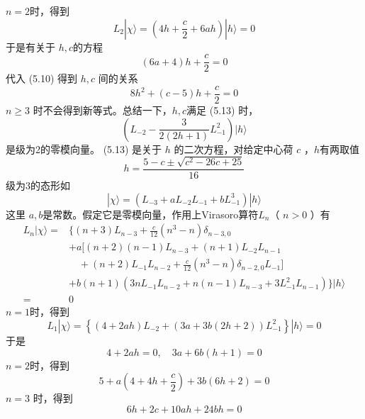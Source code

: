 $n=2 $时，得到
\begin{equation}
L_{2}|\chi\rangle=\left(4 h+\frac{c}{2}+6 a h\right)|h\rangle=0
\end{equation}
于是有关于 $h,c $的方程
\begin{equation}
	(6 a+4) h+\frac{c}{2}=0
\end{equation}
代入 (5.10) 得到 $h,c$ 间的关系
\begin{equation}
	8 h^{2}+(c-5) h+\frac{c}{2}=0
\end{equation}
$n\geq 3$ 时不会得到新等式。总结一下，$ h,c $满足 (5.13) 时，
\begin{equation}
	\left(L_{-2}-\frac{3}{2(2 h+1)} L_{-1}^{2}\right)|h\rangle
\end{equation}
是级为2的零模向量。 (5.13) 是关于 $h$ 的二次方程，对给定中心荷 $c$ ，$ h $有两取值
\begin{equation}
	h=\frac{5-c \pm \sqrt{c^{2}-26 c+25}}{16}
\end{equation}
级为3的态形如
\begin{equation}
	|\chi\rangle=\left(L_{-3}+a L_{-2} L_{-1}+b L_{-1}^{3}\right)|h\rangle
\end{equation}
这里 $a,b $是常数。假定它是零模向量，作用上Virasoro算符$ L_n $（ $n>0$ ）有
\begin{equation}
	\begin{aligned} L_{n}|\chi\rangle=&\Big\{(n+3) L_{n-3}+\frac{c}{12}\left(n^{3}-n\right) \delta_{n-3,0} \\ &+a \big[(n+2)(n-1) L_{n-3}+(n+1) L_{-2} L_{n-1} \\ &\quad +(n+2) L_{-1} L_{n-2}+\frac{c}{12} (n^{3}-n ) \delta_{n-2,0} L_{-1} \big] \\ &+b(n+1) (3 n L_{-1} L_{n-2}+n(n-1) L_{n-3} +3 L_{-1}^{2} L_{n-1} ) \Big\}|h\rangle \\=&0 \end{aligned}
\end{equation}
$n=1 $时，得到
\begin{equation}
	L_{1}|\chi\rangle=\left\{(4+2 a h) L_{-2}+(3 a+3 b(2 h+2)) L_{-1}^{2}\right\}|h\rangle=0
\end{equation}
于是
\begin{equation}
	4+2 a h=0, \quad 3 a+6 b(h+1)=0
\end{equation}
$n=2 $时，得到
\begin{equation}
	5+a\left(4+4 h+\frac{c}{2}\right)+3 b(6 h+2)=0
\end{equation}
$n=3$ 时，得到
\begin{equation}
	6 h+2 c+10 a h+24 b h=0
\end{equation}
